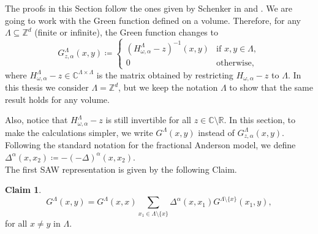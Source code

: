 \documentclass[11pt, a4paper, UKenglish, oneside]{book}
\theoremstyle{plain}
\theoremstyle{remark}
\theoremstyle{definition}
\numberwithin{equation}{section}
\numberwithin{theorem}{section}
\newtheorem{claim}[theorem]{Claim}
\begin{document}
The proofs in this Section follow the ones given by Schenker in \cite{schenker2015} and \cite{disertori2024}. We are going to work with the Green function defined on a volume. Therefore, for any $\Lambda \subseteq \mathbb{Z}^d$ (finite or infinite), the Green function changes to
\begin{equation}\label{eq:Ginlambda}
    G^{\Lambda}_{z,\alpha}(x,y) \coloneqq \begin{cases}
        (H^{\Lambda}_{\omega,\alpha} - z)^{-1}(x,y) & \text{if } x,y \in \Lambda, \\
        0 & \text{otherwise,}
    \end{cases}
\end{equation}
where $H^{\Lambda}_{\omega,\alpha} - z \in \mathbb{C}^{\Lambda \times \Lambda}$ is the matrix obtained by restricting $H_{\omega,\alpha} - z$ to $\Lambda$. In this thesis we consider $\Lambda = \mathbb{Z}^d$, but we keep the notation $\Lambda$ to show that the same result holds for any volume.

Also, notice that $H^{\Lambda}_{\omega,\alpha} - z$ is still invertible for all $z \in \mathbb{C} \setminus \mathbb{R}$. In this section, to make the calculations simpler, we write $G^{\Lambda}(x,y)$ instead of $G^{\Lambda}_{z,\alpha}(x,y)$. Following the standard notation for the fractional Anderson model, we define  $\Delta^\alpha(x, x_2) \coloneqq -(-\Delta)^\alpha(x, x_2)$.\\

The first SAW representation is given by the following Claim.
\vspace{.2cm}
\begin{claim} \label{claim:SAWrep}
\begin{equation}
    G^\Lambda(x, y) = G^\Lambda(x, x) \sum_{x_1 \in \Lambda \setminus \{x\}} \Delta^\alpha(x, x_1) G^{\Lambda \setminus \{x\}}(x_1, y),
\end{equation}
for all $x\ne y$ in $\Lambda$.
\end{claim}
\end{document}
